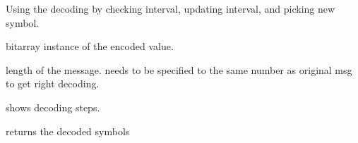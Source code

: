 \documentclass[letterpaper,10pt,english]{sphinxmanual}
\begin{document}
\begin{fulllineitems}
\begin{description}
\end{description}

\begin{fulllineitems}
\label{\detokenize{arithmetic_coding:arithmetic_coding.ArithmeticCoding.decode}}
\pysigstartsignatures
{}
\pysigstopsignatures
\sphinxAtStartPar
Using the decoding by checking interval, updating interval, and picking new symbol.
\begin{description}
\begin{description}
\sphinxAtStartPar
bitarray instance of the encoded value.

\sphinxAtStartPar
length of the message. needs to be specified to the same number as original msg to get right decoding.

\sphinxAtStartPar
shows decoding steps.

\end{description}

\begin{description}
\sphinxAtStartPar
returns the decoded symbols

\end{description}

\end{description}


\end{fulllineitems}
\end{fulllineitems}
\end{document}
